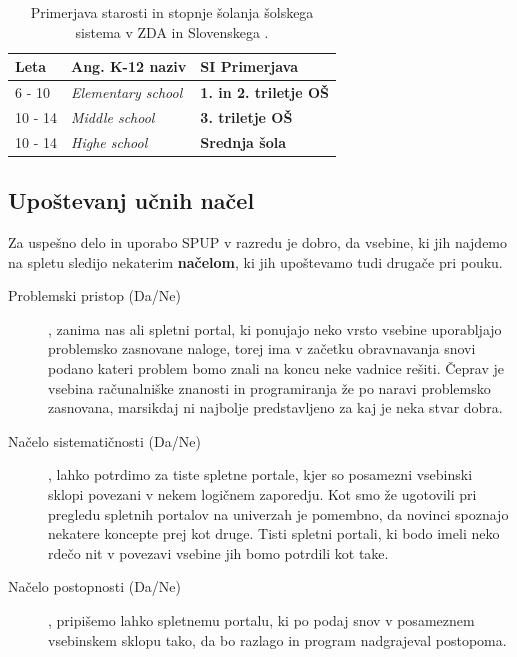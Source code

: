 \begin{table}[!h]
\caption{Primerjava starosti in stopnje šolanja šolskega sistema v ZDA
  in Slovenskega \cite{wiki:k12}.}
\label{tab:primerjava_šolski}
\begin{tabular}{
  | p{} |
  p{} |
  p{} |  }
\hline
  \rowcolor{sbase01!100}
  \textbf{Leta} & \textbf{Ang. K-12 naziv} & \textbf{SI Primerjava} \\
        \hline
      6 - 10    & \emph{Elementary school} & \textbf{1. in 2. triletje
                                             OŠ}\\
        \hline
      10 - 14    & \emph{Middle school} & \textbf{3. triletje OŠ} \\
        \hline
      10 - 14    & \emph{Highe school} & \textbf{Srednja šola} \\
  \hline
\end{tabular}
\end{table}

\subsection{Upoštevanj učnih načel}
\label{sec:upoštevanje_načel}

Za uspešno delo in uporabo SPUP v razredu je dobro, da vsebine, ki jih
najdemo na spletu sledijo nekaterim \textbf{načelom}, ki jih
upoštevamo tudi drugače pri pouku.

\begin{description}
\item[Problemski pristop (Da/Ne)], zanima nas ali spletni portal,
  ki ponujajo neko vrsto vsebine uporabljajo problemsko zasnovane
  naloge, torej ima v začetku obravnavanja snovi podano kateri problem
  bomo znali na koncu neke vadnice rešiti. Čeprav je vsebina 
  računalniške znanosti in programiranja že po naravi problemsko
  zasnovana, marsikdaj ni najbolje predstavljeno za kaj je neka stvar
  dobra.
\item[Načelo sistematičnosti (Da/Ne)], lahko potrdimo za tiste
  spletne portale, kjer so posamezni vsebinski sklopi povezani v nekem
  logičnem zaporedju. Kot smo že ugotovili pri pregledu spletnih
  portalov na univerzah je pomembno, da novinci spoznajo nekatere
  koncepte prej kot druge. Tisti spletni portali, ki bodo imeli neko
  rdečo nit v povezavi vsebine jih bomo potrdili kot take.
\item[Načelo postopnosti (Da/Ne)], pripišemo lahko spletnemu portalu,
  ki po podaj snov v posameznem vsebinskem sklopu tako, da bo razlago
  in program nadgrajeval postopoma. 
\end{description}

